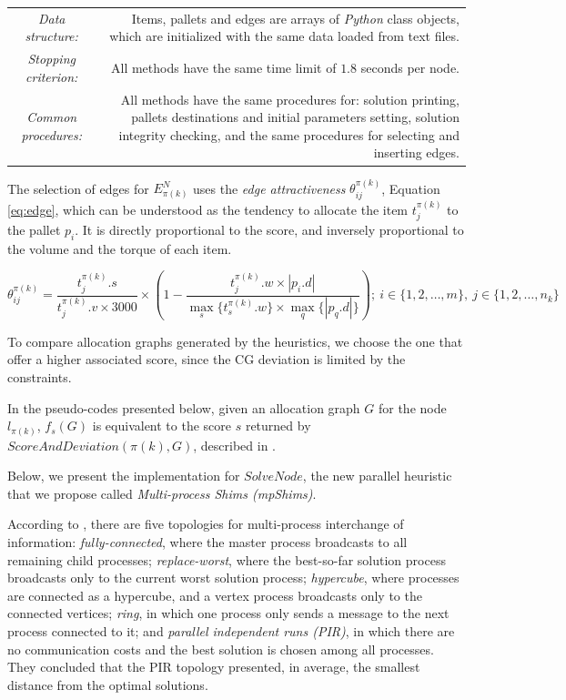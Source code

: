 \documentclass[preprint,authoryear]{elsarticle}
\begin{document}
\bgroup
\def\arraystretch{1.2}
\begin{table}[H]
	\centering
	\small
	\begin{tabular}{CD}
		
		{\it Data structure:}     & Items, pallets and edges are arrays of \emph{Python} class objects, which are initialized with the same data loaded from text files. \\
		
		{\it Stopping criterion:} & All methods have the same time limit of $1.8$ seconds per node.\\
		
		{\it Common procedures:}  & All methods have the same procedures for: solution printing, pallets destinations and initial parameters setting, solution integrity checking, and the same procedures for selecting and inserting edges.\\

	\end{tabular}
	\normalsize
\end{table}
\egroup

The selection of edges for $E^N_{\pi(k)}$\/ uses the {\it edge attractiveness}\/ $\theta^{\pi(k)}_{ij}$, Equation \ref{eq:edge}, which can be understood as the tendency to allocate the item $t^{\pi(k)}_j$\/ to the pallet $p_i$. It is directly proportional to the score, and inversely proportional to the volume and the torque of each item. 

\begin{equation} \label{eq:edge}
	\theta^{\pi(k)}_{ij}= \frac{t^{\pi(k)}_j.s}{t^{\pi(k)}_j.v \times 3000}\times(1-\frac{t^{\pi(k)}_j.w\times|p_i.d|}{\max_s\{t^{\pi(k)}_s.w\}\times\max_q\{|p_q.d|\}});\ i \in \{1,2,\ldots,m\},\ j \in \{1,2,\ldots,n_k\}
\end{equation} 

To compare allocation graphs generated by the heuristics, we choose the one that offer a higher associated score, since the CG deviation is limited by the constraints.

In the pseudo-codes presented below, given an allocation graph $G$\/ for the node $l_{\pi(k)}$, $f_s(G)$\/ is equivalent to the score $s$\/ returned by $ScoreAndDeviation({\pi(k)},G) $, described in \cite{MesquitaSanches2023}.

Below, we present the implementation for $SolveNode$, the new parallel heuristic that we propose called {\it Multi-process Shims (mpShims)}.

According to \cite[p.226]{manfrin2006}, there are five topologies for multi-process interchange of information: {\it fully-connected}, where the master process broadcasts to all remaining child processes; {\it replace-worst}, where the best-so-far solution process broadcasts only to the current worst solution process; {\it hypercube}, where processes are connected as a hypercube, and a vertex process broadcasts only to the connected vertices; {\it ring}, in which one process only sends a message to the next process connected to it; and {\it parallel independent runs (PIR)}, in which there are no communication costs and the best solution is chosen among all processes. They concluded that the PIR topology presented, in average, the smallest distance from the optimal solutions.
\end{document}
